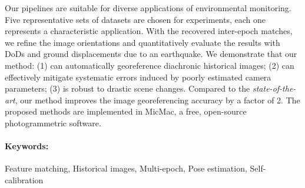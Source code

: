 \documentclass[a4paper,11pt,twoside]{ThesisStyle}
\begin{document}
Our pipelines are suitable for diverse applications of environmental monitoring. Five representative sets of datasets are chosen for experiments, each one represents a characteristic application. 
With the recovered inter-epoch matches, we refine the image orientations and quantitatively evaluate the results with \ac{DoD}s and ground displacements due to an earthquake. We demonstrate that our method: (1) can automatically georeference diachronic historical images; (2) can effectively mitigate systematic errors induced by poorly estimated camera parameters; (3) is robust to drastic scene changes. Compared to the \textit{state-of-the-art}, our method improves the image georeferencing accuracy by a factor of 2. The proposed methods are implemented in MicMac, a free, open-source photogrammetric software.\\


\paragraph{Keywords:} Feature matching, Historical images, Multi-epoch, Pose estimation, Self-calibration

\newpage
\end{document}
